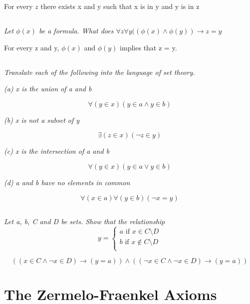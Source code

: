 \documentclass[11pt,oneside,titlepage]{book}
\begin{document}
For every $z$ there exists x and y such that x is in y and y is in z

\subsection{}

\textit{Let $\phi(x)$ be a formula. What does $\forall z \forall y((\phi(x) \land \phi(y))
  \to z = y$}

For every z and y, $\phi(x)$ and $\phi(y)$ implies that z = y.

\subsection{}

\textit{Translate each of the following into the language of set theory.}

\textit{(a) x is the union of a and b}

$$\forall (y \in x) (y \in a \land y \in b)$$

\textit{(b) x is not a subset of y}

$$\exists (z \in x) (\neg z \in y)$$

\textit{(c) x is the intersection of a and b}

$$\forall (y \in x) (y \in a \lor y \in b)$$

\textit{(d) a and b have no elements in common}

$$\forall (x \in a) \forall (y \in b) (\neg x = y)$$

\subsection{}

\textit{Let a, b, C and D be sets. Show that the relationship}
$$y =
\begin{cases}
  a \text{ if } x \in C \setminus D \\
  b \text{ if } x \notin C \setminus D \\
\end{cases}
$$

$$((x \in C \land \neg x \in D) \to (y = a)) \land ((\neg x \in C \land \neg x \in D) \to (y = a))$$


\section{The Zermelo-Fraenkel Axioms}

\subsection{}
\end{document}
